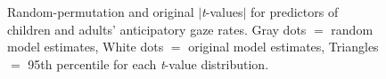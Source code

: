 \documentclass[authoryear, 12pt]{elsarticle}
\begin{document}
\begin{figure}[h!]
  \centering
  \hfill
  \caption{Random-permutation and original $|$\textit{t}-values$|$ for predictors of children and adults' anticipatory gaze rates. Gray dots $=$ random model estimates, White dots $=$ original model estimates, Triangles $=$ 95th percentile for each \textit{t}-value distribution.}
\end{figure}
\end{document}
